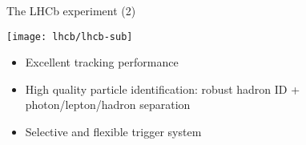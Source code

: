 \begin{frame}[t]{The LHCb experiment (2)}

\centering

\texttt{[image: lhcb/lhcb-sub]}

\begin{itemize}
\item Excellent tracking performance
\item High quality particle identification: robust hadron ID + photon/lepton/hadron separation
\item Selective and flexible trigger system
\end{itemize}
\end{frame}